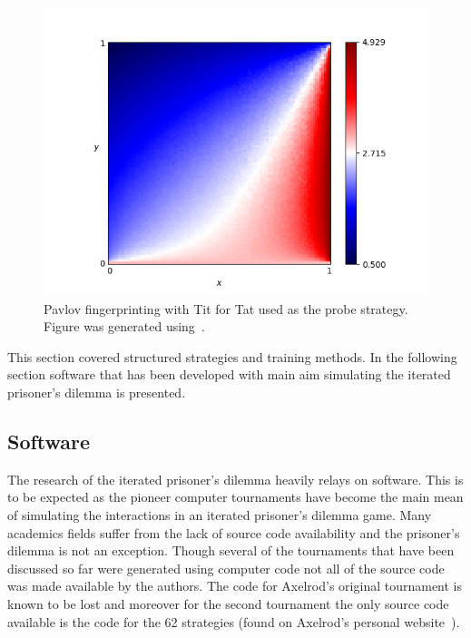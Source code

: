 \documentclass{article}
\theoremstyle{definition}
\begin{document}
\begin{figure}[!hbtp]
    \centering
    \includegraphics[height=.3\textheight]{./assets/images/Win-Stay_Lose-Shift.png}
    \caption{Pavlov fingerprinting with Tit for Tat used as the probe strategy.
    Figure was generated using~\cite{axelrodproject}.}
    \label{fig:fingerprinting}
\end{figure}

This section covered structured strategies and training methods. In the following
section software that has been developed with main aim simulating the iterated
prisoner's dilemma is presented.

\subsection{Software}\label{section:software}

The research of the iterated prisoner's dilemma heavily relays on software.
This is to be expected as the pioneer computer tournaments have become the main
mean of simulating the interactions in an iterated prisoner's dilemma game.
Many academics fields suffer from the lack of source code availability and the prisoner's dilemma
is not an exception. Though several of the tournaments that have been discussed so far were generated
using computer code not all of the source code was made available by the authors.
The code for Axelrod's original tournament is known to be lost and
moreover for the second tournament the only source code available is the code
for the 62 strategies (found on Axelrod's personal website~\cite{fortan_code}).
\end{document}
